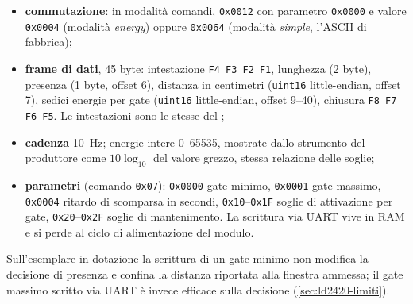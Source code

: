 \begin{itemize}[leftmargin=1.4em,itemsep=2pt]
  \item \textbf{commutazione}: in modalità comandi, \texttt{0x0012} con parametro
        \texttt{0x0000} e valore \texttt{0x0004} (modalità \emph{energy}) oppure
        \texttt{0x0064} (modalità \emph{simple}, l'ASCII di fabbrica);
  \item \textbf{frame di dati}, 45 byte: intestazione \texttt{F4 F3 F2 F1},
        lunghezza (2 byte), presenza (1 byte, offset 6), distanza in centimetri
        (\texttt{uint16} little-endian, offset 7), sedici energie per gate
        (\texttt{uint16} little-endian, offset 9--40), chiusura
        \texttt{F8 F7 F6 F5}. Le intestazioni sono le stesse del \ldb;
  \item \textbf{cadenza} 10~Hz; energie intere 0--65535, mostrate dallo strumento del
        produttore come $10\log_{10}$ del valore grezzo, stessa relazione delle
        soglie;
  \item \textbf{parametri} (comando \texttt{0x07}): \texttt{0x0000} gate minimo,
        \texttt{0x0001} gate massimo, \texttt{0x0004} ritardo di scomparsa in
        secondi, \texttt{0x10}--\texttt{0x1F} soglie di attivazione per gate,
        \texttt{0x20}--\texttt{0x2F} soglie di mantenimento. La scrittura via UART
        vive in RAM e si perde al ciclo di alimentazione del modulo.
\end{itemize}

Sull'esemplare in dotazione la scrittura di un gate minimo non modifica la decisione
di presenza e confina la distanza riportata alla finestra ammessa; il gate massimo
scritto via UART è invece efficace sulla decisione (\cref{sec:ld2420-limiti}).
